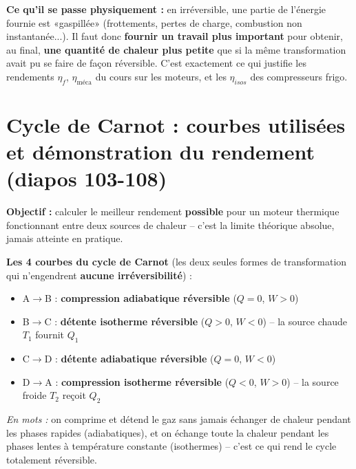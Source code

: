 \begin{retenir}
\textbf{Ce qu'il se passe physiquement :} en irréversible, une partie de l'énergie fournie est «gaspillée» (frottements, pertes de charge, combustion non instantanée...). Il faut donc \textbf{fournir un
travail plus important} pour obtenir, au final, \textbf{une quantité de chaleur plus petite} que si la
même transformation avait pu se faire de façon réversible. C'est exactement ce qui justifie les rendements
$\eta_f$, $\eta_{\text{méca}}$ du cours sur les moteurs, et les $\eta_{isos}$ des compresseurs frigo.
\end{retenir}

\newpage
\section{Cycle de Carnot : courbes utilisées et démonstration du rendement (diapos 103-108)}

\begin{objectif}
\textbf{Objectif :} calculer le meilleur rendement \textbf{possible} pour un moteur thermique fonctionnant
entre deux sources de chaleur -- c'est la limite théorique absolue, jamais atteinte en pratique.
\end{objectif}

\textbf{Les 4 courbes du cycle de Carnot} (les deux seules formes de transformation qui n'engendrent
\textbf{aucune irréversibilité}) :
\begin{itemize}[leftmargin=1.4em]
\item A$\to$B : \textbf{compression adiabatique réversible} ($Q=0$, $W>0$)
\item B$\to$C : \textbf{détente isotherme réversible} ($Q>0$, $W<0$) -- la source chaude $T_1$ fournit $Q_1$
\item C$\to$D : \textbf{détente adiabatique réversible} ($Q=0$, $W<0$)
\item D$\to$A : \textbf{compression isotherme réversible} ($Q<0$, $W>0$) -- la source froide $T_2$ reçoit
$Q_2$
\end{itemize}
\emph{En mots :} on comprime et détend le gaz sans jamais échanger de chaleur pendant les phases rapides
(adiabatiques), et on échange toute la chaleur pendant les phases lentes à température constante
(isothermes) -- c'est ce qui rend le cycle totalement réversible.


